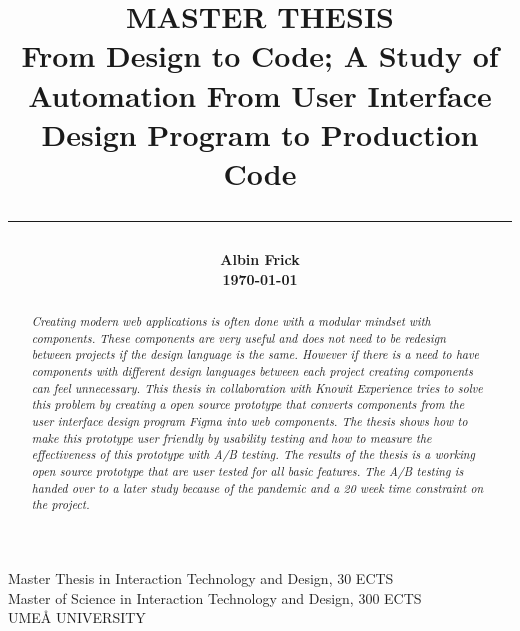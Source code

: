 \title{
    \Large MASTER THESIS\\
    \vspace{5mm}
    \huge \bf
        From Design to Code; A Study of Automation From User Interface Design Program to Production Code\\
        \noindent\rule{\textwidth}{0.4pt}

}

\date{} %
\author{
    \LARGE\bf{Albin Frick}\\
    \today
}

\maketitle
\vspace*{\fill}
\begin{center}
Master Thesis in Interaction Technology and Design, 30 ECTS\\
Master of Science in Interaction Technology and Design, 300 ECTS\\
UMEÅ UNIVERSITY
\end{center}
\newpage
\tableofcontents
\newpage
{}
\begin{abstract}
\textit{Creating modern web applications is often done with a modular mindset with components. These components are very useful and does not need to be redesign between projects if the design language is the same. However if there is a need to have components with different design languages between each project creating components can feel unnecessary. This thesis in collaboration with Knowit Experience tries to solve this problem by creating a open source prototype that converts components from the user interface design program Figma into web components. The thesis shows how to make this prototype user friendly by usability testing and how to measure the effectiveness of this prototype with A/B testing. The results of the thesis is a working open source prototype that are user tested for all basic features. The A/B testing is handed over to a later study because of the pandemic and a 20 week time constraint on the project.}

\end{abstract}
\newpage
